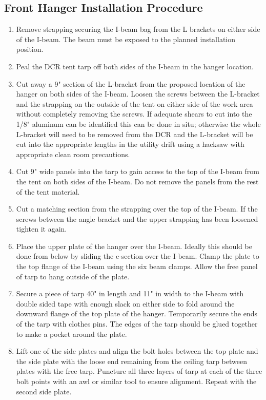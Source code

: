 \documentclass[11pt]{article}
\begin{document}
\subsection{Front Hanger Installation Procedure}
\begin{enumerate}
\item Remove strapping securing the I-beam bag from the L brackets on either side of the I-beam. The beam must be exposed to the planned installation position.
\item Peal the DCR tent tarp off both sides of the I-beam in the hanger location. 
\item Cut away a 9" section of the L-bracket from the proposed location of the hanger on both sides of the I-beam. Loosen the screws between the L-bracket and the strapping on the outside of the tent on either side of the work area without completely removing the screws. If adequate shears to cut into the 1/8" aluminum can be identified this can be done in situ; otherwise the whole L-bracket will need to be removed from the DCR and the L-bracket will be cut into the appropriate lengths in the utility drift using a hacksaw with appropriate clean room precautions.
\item Cut  9" wide panels into the tarp to gain access to the top of the I-beam from the tent on both sides of the I-beam. Do not remove the panels from the rest of the tent material. 
\item Cut a matching section from the strapping over the top of the I-beam. If the screws between the angle bracket and the upper strapping has been loosened tighten it again. 
\item Place the upper plate of the hanger over the I-beam. Ideally this should be done from below by sliding the c-section over the I-beam. Clamp the plate to the top flange of the I-beam using the six beam clamps. Allow the free panel of tarp to hang outside of the plate.
\item Secure a piece of tarp 40" in length and 11" in width to the I-beam with double sided tape with enough slack on either side to fold around the downward flange of the top plate of the hanger. Temporarily secure the ends of the tarp with clothes pins. The edges of the tarp should be glued together to make a pocket around the plate. 
\item Lift one of the side plates and align the bolt holes between the top plate and the side plate with the loose end remaining from the ceiling tarp between plates with the free tarp. Puncture all three layers of tarp at each of the three bolt points with an awl or similar tool to ensure alignment. Repeat with the second side plate.

\end{enumerate}
\end{document}
